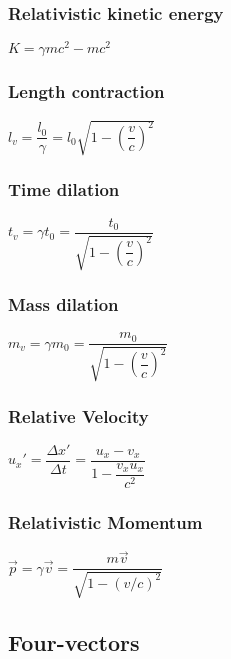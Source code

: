 \subsubsection{Relativistic kinetic energy}
\begin{itemize}
\itemt \( K = \gamma mc^2 - mc^2 \)
\end{itemize}

\subsubsection{Length contraction}
\begin{itemize}
\itemt \( l_v = \dfrac{l_0}{\gamma} = l_0\sqrt{1-(\dfrac{v}{c})^2} \)
\end{itemize}

\subsubsection{Time dilation}
\begin{itemize}
\itemt \( t_v = \gamma t_0 = \dfrac{t_0}{\sqrt{1-(\dfrac{v}{c})^2}}\)
\end{itemize}

\subsubsection{Mass dilation}
\begin{itemize}
\itemt \( m_v = \gamma m_0 = \dfrac{m_0}{\sqrt{1-(\dfrac{v}{c})^2}}\)
\end{itemize}

\subsubsection{Relative Velocity}
\begin{itemize}
\itemt \( u_x'= \dfrac{\Delta x'}{\Delta  t} = \dfrac{u_x-v_x}{1-\dfrac{v_xu_x}{c^2}} \)
\end{itemize}

\subsubsection{Relativistic Momentum}
\begin{itemize}
\itemt \( \vec{p} = \gamma \vec{v} = \dfrac{m\vec{v}}{\sqrt{1-(v/c)^2}} \)
\end{itemize}

\subsection{Four-vectors}
\def\arraystretch{1}
